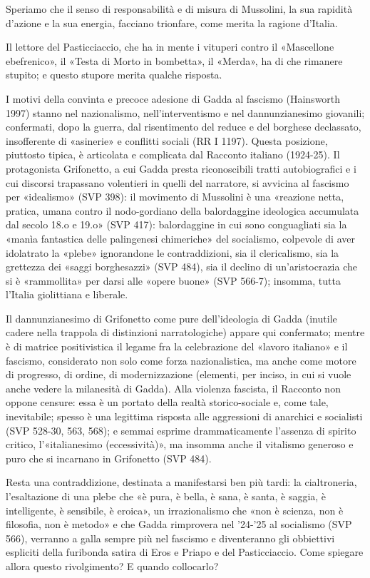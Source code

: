 Speriamo che il senso di responsabilità e di misura di Mussolini, la sua rapidità d’azione e la sua energia, facciano trionfare, come merita la ragione d’Italia.

Il lettore del Pasticciaccio, che ha in mente i vituperi contro il «Mascellone ebefrenico», il «Testa di Morto in bombetta», il «Merda», ha di che rimanere stupito; e questo stupore merita qualche risposta.

I motivi della convinta e precoce adesione di Gadda al fascismo (Hainsworth 1997) stanno nel nazionalismo, nell’interventismo e nel dannunzianesimo giovanili; confermati, dopo la guerra, dal risentimento del reduce e del borghese declassato, insofferente di «asinerie» e conflitti sociali (RR I 1197). Questa posizione, piuttosto tipica, è articolata e complicata dal Racconto italiano (1924-25). Il protagonista Grifonetto, a cui Gadda presta riconoscibili tratti autobiografici e i cui discorsi trapassano volentieri in quelli del narratore, si avvicina al fascismo per «idealismo» (SVP 398): il movimento di Mussolini è una «reazione netta, pratica, umana contro il nodo-gordiano della balordaggine ideologica accumulata dal secolo 18.o e 19.o» (SVP 417): balordaggine in cui sono conguagliati sia la «manìa fantastica delle palingenesi chimeriche» del socialismo, colpevole di aver idolatrato la «plebe» ignorandone le contraddizioni, sia il clericalismo, sia la grettezza dei «saggi borghesazzi» (SVP 484), sia il declino di un’aristocrazia che si è «rammollita» per darsi alle «opere buone» (SVP 566-7); insomma, tutta l’Italia giolittiana e liberale.

Il dannunzianesimo di Grifonetto come pure dell’ideologia di Gadda (inutile cadere nella trappola di distinzioni narratologiche) appare qui confermato; mentre è di matrice positivistica il legame fra la celebrazione del «lavoro italiano» e il fascismo, considerato non solo come forza nazionalistica, ma anche come motore di progresso, di ordine, di modernizzazione (elementi, per inciso, in cui si vuole anche vedere la milanesità di Gadda). Alla violenza fascista, il Racconto non oppone censure: essa è un portato della realtà storico-sociale e, come tale, inevitabile; spesso è una legittima risposta alle aggressioni di anarchici e socialisti (SVP 528-30, 563, 568); e semmai esprime drammaticamente l’assenza di spirito critico, l’«italianesimo (eccessività)», ma insomma anche il vitalismo generoso e puro che si incarnano in Grifonetto (SVP 484).

Resta una contraddizione, destinata a manifestarsi ben più tardi: la cialtroneria, l’esaltazione di una plebe che «è pura, è bella, è sana, è santa, è saggia, è intelligente, è sensibile, è eroica», un irrazionalismo che «non è scienza, non è filosofia, non è metodo» e che Gadda rimprovera nel ’24-’25 al socialismo (SVP 566), verranno a galla sempre più nel fascismo e diventeranno gli obbiettivi espliciti della furibonda satira di Eros e Priapo e del Pasticciaccio. Come spiegare allora questo rivolgimento? E quando collocarlo?

